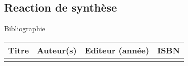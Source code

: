 \begin{headerBlock}
\chapter{Reaction de synthèse}
\label{LC_ReactionSynthese}
 \end{headerBlock}



\begin{reportBlock}{Bibliographie}

\begin{center}
\begin{tabularx}{\textwidth}{| X | X | c | c |}\hline
Titre & Auteur(s) & Editeur (année) & ISBN \\ \hline
 &  &  &  \\ 
 \hline
\end{tabularx}
\end{center}

\end{reportBlock}

